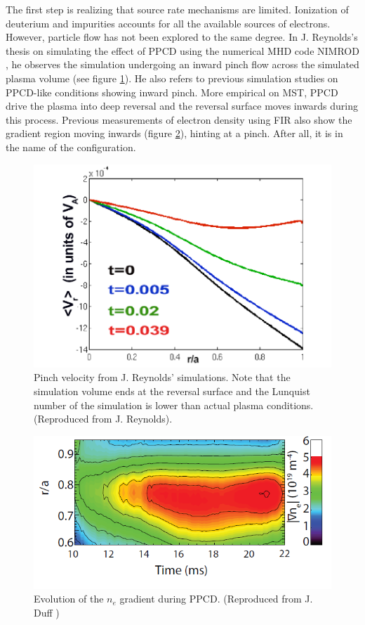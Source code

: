 The first step is realizing that source rate mechanisms are limited. Ionization of deuterium and impurities accounts for all the available sources of electrons. However, particle flow has not been explored to the same degree. In J. Reynolds's thesis on simulating the effect of PPCD using the numerical MHD code NIMROD \cite{Reynolds2007}, he observes the simulation undergoing an inward pinch flow across the simulated plasma volume (see figure \ref{fig:NIMROD_pinch}). He also refers to previous simulation studies on PPCD-like conditions showing inward pinch\cite{Puiatti2003, Ashida2005, Svidzinski2007}. More empirical on MST, PPCD drive the plasma into deep reversal and the reversal surface moves inwards during this process. Previous measurements of electron density using FIR also show the gradient region moving inwards (figure \ref{fig:ne_gradient_pinch}), hinting at a pinch. After all, it is in the name of the configuration.

\begin{figure}
    \centering
    \includegraphics[width = 5.5in]{ion_transport_results/reynold_pinch.png}
    \caption[Pinch velocity from J. Reynolds' simulations]{Pinch velocity from J. Reynolds' simulations. Note that the simulation volume ends at the reversal surface and the Lunquist number of the simulation is lower than actual plasma conditions. (Reproduced from J. Reynolds\cite{Reynolds2007}). }
    \label{fig:NIMROD_pinch}
\end{figure}

\begin{figure}
    \centering
    \includegraphics[width = 0.8\linewidth]{ion_transport_results/duff_gradient.png}
    \caption[Evolution of the $n_e$ gradient during PPCD]{Evolution of the $n_e$ gradient during PPCD. (Reproduced from J. Duff \cite{Duff2018})}
    \label{fig:ne_gradient_pinch}
\end{figure}


